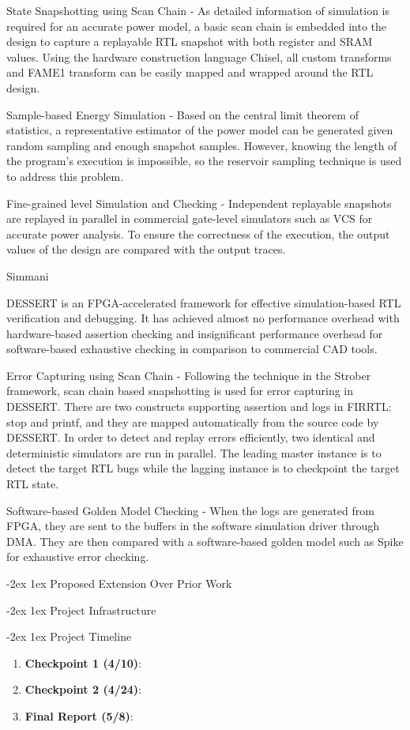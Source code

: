 \documentclass[11pt]{article}
\makeatletter
\renewcommand{\section}
{\@startsection {section}{1}{0pt}
 {-2ex}
 {1ex}
 {\bfseries\Large}}
\makeatother
\begin{document}
State Snapshotting using Scan Chain - As detailed information of simulation is required
for an accurate power model, a basic scan chain is embedded into the design to capture
a replayable RTL snapshot with both register and SRAM values. Using the hardware
construction language Chisel, all custom transforms and FAME1 transform can be easily
mapped and wrapped around the RTL design.

Sample-based Energy Simulation - Based on the central limit theorem of statistics,
a representative estimator of the power model can be generated given random sampling
and enough snapshot samples. However, knowing the length of the program's execution
is impossible, so the reservoir sampling technique is used to address this problem.

Fine-grained level Simulation and Checking - Independent replayable snapshots are replayed in parallel in
commercial gate-level simulators such as VCS for accurate power analysis. To ensure the correctness of the execution, the output values
of the design are compared with the output traces.

Simmani\autocite{simmani}

DESSERT\autocite{dessert} is an FPGA-accelerated framework for effective simulation-based RTL verification and debugging. It has achieved almost no performance overhead with hardware-based assertion checking and insignificant performance overhead for software-based exhaustive checking in comparison to commercial CAD tools.

Error Capturing using Scan Chain - Following the technique in the Strober framework, scan chain based snapshotting is used for error capturing in DESSERT. There are two constructs supporting assertion and logs in FIRRTL: stop and printf, and they are mapped automatically from the source code by DESSERT. In order to detect and replay errors efficiently, two identical and deterministic simulators are run in parallel. The leading master instance is to detect the target RTL bugs while the lagging instance is to checkpoint the target RTL state.

Software-based Golden Model Checking - When the logs are generated from FPGA, they are sent to the
buffers in the software simulation driver through DMA. They are then compared with a software-based golden model such as Spike for exhaustive error checking.

\section{Proposed Extension Over Prior Work}

\section{Project Infrastructure}

\section{Project Timeline}

\begin{enumerate}
  \item \textbf{Checkpoint 1 (4/10)}:
  \item \textbf{Checkpoint 2 (4/24)}:
  \item \textbf{Final Report (5/8)}:
\end{enumerate}

\printbibliography
\end{document}
